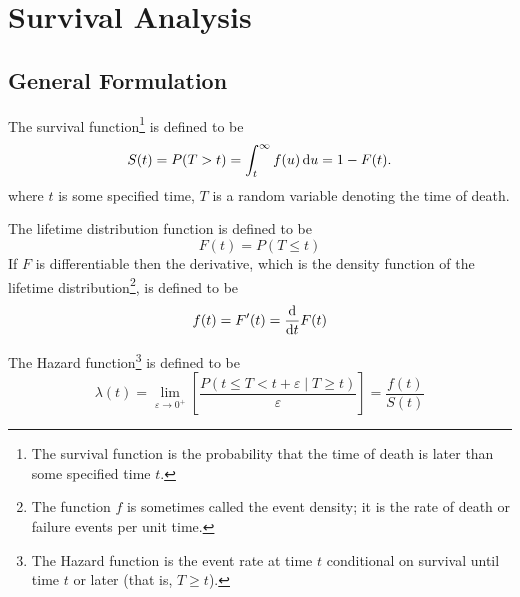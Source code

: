 \chapter{Survival Analysis}

\section{General Formulation}

\begin{definition}
	The survival function\footnote{The survival function is the probability that the time of death is later than some specified time $t$.} is defined to be
	\begin{equation}
		S(t)=P(T>t)=\int_{t}^{\infty}f(u)\mathop{}\!\mathrm{d} u=1-F(t).
	\end{equation}
	where $t$ is some specified time, $T$ is a random variable denoting the time of death.
\end{definition}

\begin{definition}
	The lifetime distribution function is defined to be
	\begin{equation}
		F(t)=P(T\leq t)
	\end{equation}
	If $F$ is differentiable then the derivative, which is the density function of the lifetime distribution\footnote{The function $f$ is sometimes called the event density; it is the rate of death or failure events per unit time.}, is defined to be
	\begin{equation}
		f(t)=F^{\prime}(t)=\frac{\mathop{}\!\mathrm{d}}{\mathop{}\!\mathrm{d} t}F(t)
	\end{equation}
\end{definition}

\begin{definition}
	The Hazard function\footnote{The Hazard function is the event rate at time $t$ conditional on survival until time $t$ or later (that is, $T\geq t$).} is defined to be
	\begin{equation}
		\lambda(t)=\lim_{\varepsilon\rightarrow 0^{+}}\left[\frac{P(t\leq T<t+\varepsilon\mid T\geq t)}{\varepsilon}\right]=\frac{f(t)}{S(t)}
	\end{equation}
\end{definition}


